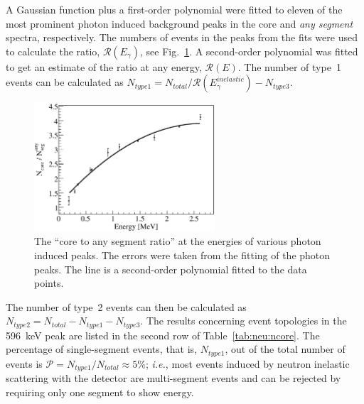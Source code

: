 A Gaussian function plus a first-order polynomial were fitted to
eleven of the most prominent photon induced background peaks in the
core and \emph{any segment} spectra, respectively. The numbers of
events in the peaks from the fits were used to calculate the ratio,
$\mathcal{R}(E_{\gamma})$, see Fig.~\ref{fig:neu:sf}. A second-order
polynomial was fitted to get an estimate of the ratio at any energy,
$\mathcal{R}(E)$. The number of type~1 events can be calculated as
$N_{type1} = N_{total} / \mathcal{R}(E_{\gamma}^{inelastic}) -
N_{type3}$.

\begin{figure}[tbhp]
\centering
\includegraphics[width=0.6\textwidth,clip]{sf}
\caption{The ``core to any segment ratio'' at the energies of various
photon induced peaks. The errors were taken from the fitting of the
photon peaks. The line is a second-order polynomial fitted to the data
points.}
\label{fig:neu:sf}
\end{figure}

The number of type~2 events can then be calculated as $N_{type2} =
N_{total} - N_{type1} - N_{type3}$. The results concerning event
topologies in the 596~keV peak are listed in the second row of
Table~\ref{tab:neu:ncore}. The percentage of single-segment events,
that is, $N_{type1}$, out of the total number of events is
$\mathcal{P} = N_{type1} / N_{total} \approx 5\%$; \textit{i.e.}, most
events induced by neutron inelastic scattering with the detector are
multi-segment events and can be rejected by requiring only one segment
to show energy.

